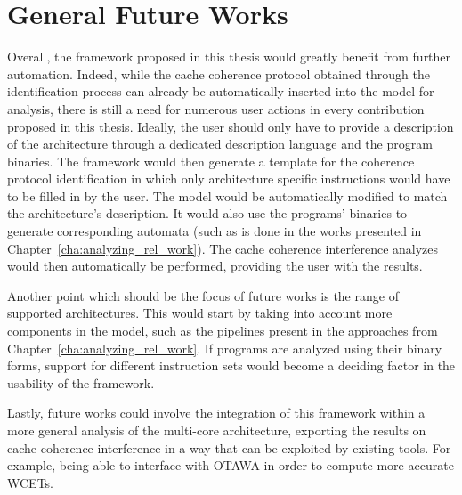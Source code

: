 \section{General Future Works}
Overall, the framework proposed in this thesis would greatly benefit from
further automation. Indeed, while the cache coherence protocol obtained through
the identification process can already be automatically inserted into the model
for analysis, there is still a need for numerous user actions in every
contribution proposed in this thesis. Ideally, the user should only have to
provide a description of the architecture through a dedicated description
language and the program binaries. The framework would then generate a template
for the coherence protocol identification in which only architecture specific
instructions would have to be filled in by the user. The model would be
automatically modified to match the architecture's description. It would also
use the programs' binaries to generate corresponding automata (such as is done
in the works presented in Chapter~\ref{cha:analyzing_rel_work}). The cache
coherence interference analyzes would then automatically be performed,
providing the user with the results.

Another point which should be the focus of future works is the range of
supported architectures. This would start by taking into account more
components in the model, such as the pipelines present in the approaches from
Chapter~\ref{cha:analyzing_rel_work}. If programs are analyzed using their
binary forms, support for different instruction sets would become a deciding
factor in the usability of the framework.

Lastly, future works could involve the integration of this framework within a
more general analysis of the multi-core architecture, exporting the results on
cache coherence interference in a way that can be exploited by existing tools.
For example, being able to interface with OTAWA
\cite{10.1007/978-3-642-16256-5_6} in order to compute more accurate WCETs.

